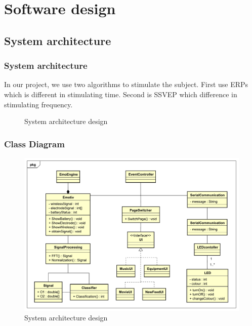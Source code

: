 \chapter{Software design}

\label{ch:Software design}

\setlength{\parindent}{4em}
\setlength{\parskip}{1em}
\renewcommand{\baselinestretch}{1.5}

\section{System architecture}

\subsection{System architecture}
\hspace{1.5cm}In our project, we use two algorithms to stimulate the subject. First use ERPs which is different in stimulating time. Second is SSVEP which difference in stimulating frequency.

\begin{figure}[h]
	\centering
	\caption{System architecture design}
\end{figure}

\subsection{Class Diagram}

\begin{figure}[h]
	\centering
	\includegraphics[scale = 0.7]{chapter5/Class.pdf}
	\caption{System architecture design}
\end{figure}